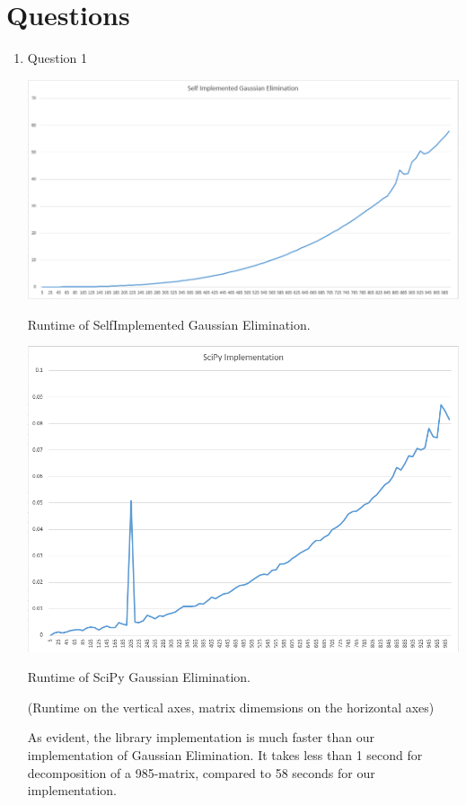 \documentclass[a4paper, 11pt]{article}
\begin{document}
\section{Questions}
\begin{enumerate}


\item Question 1

\begin{center}
  \includegraphics[width=\linewidth]{images/SelfImplemented.PNG}
\end{center}
Runtime of SelfImplemented Gaussian Elimination.

\begin{center}
  \includegraphics[width=\linewidth]{images/ScipyImplementation.PNG}
\end{center}
Runtime of SciPy Gaussian Elimination.


(Runtime on the vertical axes, matrix dimemsions on the horizontal axes)

As evident, the library implementation is much faster than our implementation of Gaussian Elimination. It takes less than 1 second for decomposition of a 985-matrix, compared to 58 seconds for our implementation. 


\end{enumerate}
\end{document}
